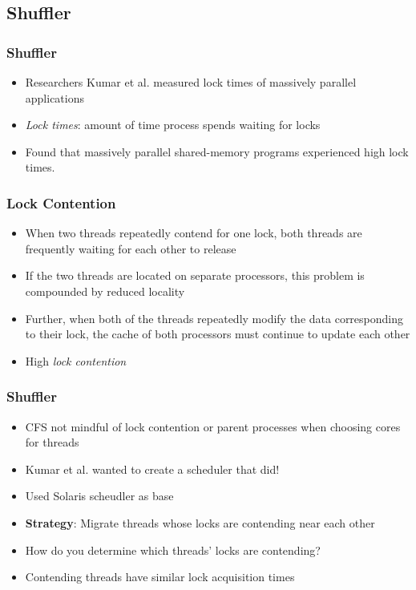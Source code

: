 \documentclass{beamer}
\newcommand{\linespace}{\vskip 0.25cm}
\begin{document}
\subsection{Shuffler}
\begin{frame}
\frametitle{Shuffler}

\begin{itemize}


\item Researchers Kumar et al. measured lock times of massively parallel applications
\item \emph{Lock times}: amount of time process spends waiting for locks

\linespace

\item Found that massively parallel shared-memory programs experienced high lock times.


\end{itemize}

\end{frame}

\begin{frame}
\frametitle{Lock Contention}

\begin{itemize}



\item When two threads repeatedly contend for one lock, both threads are frequently waiting for each other to release
\linespace
\item If the two threads are located on separate processors, this problem is compounded by reduced locality
\linespace
\item Further, when both of the threads repeatedly modify the data corresponding to their lock, the cache of both processors must continue to update each other
\linespace
\item High \emph{lock contention}

\end{itemize}

\end{frame}


\begin{frame}
\frametitle{Shuffler}
\begin{itemize}
	\item CFS not mindful of lock contention or parent processes when choosing cores for threads
	
	\item Kumar et al. wanted to create a scheduler that did!
	\item Used Solaris scheudler as base
	\linespace
	\item \textbf{Strategy}: Migrate threads whose locks are contending near each other
	\linespace
	
	\item How do you determine which threads' locks are contending?
	\item Contending threads have similar lock acquisition times
	
\end{itemize}
\end{frame}
\end{document}
